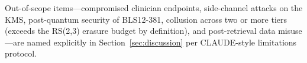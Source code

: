 Out-of-scope items---compromised clinician endpoints, side-channel attacks on the KMS, post-quantum security of BLS12-381, collusion across two or more tiers (exceeds the RS(2,3) erasure budget by definition), and post-retrieval data misuse---are named explicitly in Section~\ref{sec:discussion} per CLAUDE-style limitations protocol.
